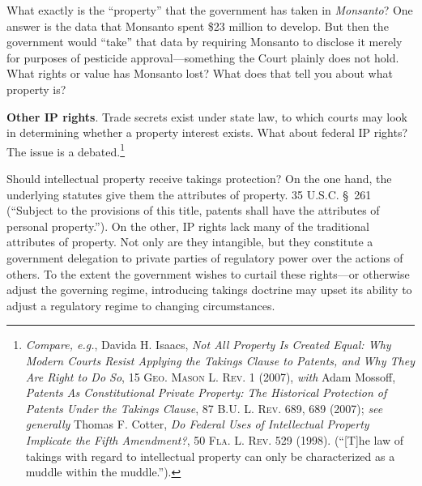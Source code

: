 

\item What exactly is the ``property'' that the government has taken in
\emph{Monsanto}? One answer is the data that Monsanto spent \$23 million to
develop. But then the government would ``take'' that data by requiring
Monsanto to disclose it merely for purposes of pesticide approval---something
the Court plainly does not hold. What rights or value has Monsanto lost? What
does that tell you about what property is?


\item \textbf{Other IP rights}.
Trade secrets exist under state law, to which courts may look in determining
whether a property interest exists. What about federal IP rights? The issue is a
debated.\footnote{\textit{Compare, e.g.}, Davida H. Isaacs, \textit{Not All
Property Is Created Equal: Why Modern Courts Resist Applying the Takings Clause
to Patents, and Why They Are Right to Do So}, 15 \textsc{Geo. Mason L. Rev.} 1
(2007), \textit{with} Adam Mossoff, \textit{Patents As Constitutional Private
Property: The Historical Protection of Patents Under the Takings Clause}, 87
\textsc{B.U. L. Rev}. 689, 689 (2007); \textit{see generally} Thomas F. Cotter,
\textit{Do Federal Uses of Intellectual Property Implicate the Fifth
Amendment?}, 50 \textsc{Fla. L. Rev}. 529 (1998). (``[T]he law of takings with
regard to intellectual property can only be characterized as a muddle within the
muddle.'').}


Should intellectual property receive takings protection? On the one hand, the
underlying statutes give them the attributes of property. 35 U.S.C. \S~261
(``Subject to the provisions of this title, patents shall have the attributes of
personal property.''). On the other, IP rights lack many of the traditional
attributes of property. Not only are they intangible, but they constitute a
government delegation to private parties of regulatory power over the actions of
others. To the extent the government wishes to curtail these rights---or
otherwise adjust the governing regime, introducing takings doctrine may upset
its ability to adjust a regulatory regime to changing circumstances. 


